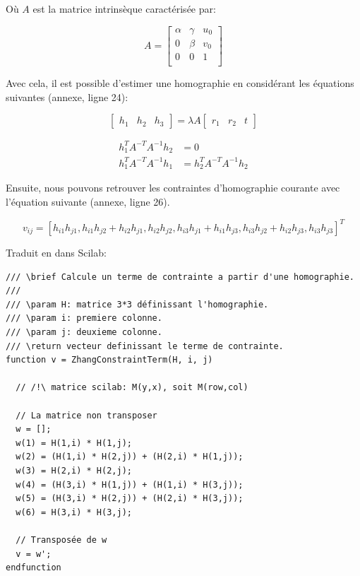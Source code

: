 \documentclass[a4paper,11pt]{article}
\begin{document}
Où $A$ est la matrice intrinsèque caractérisée par:

\begin{equation}
  A=
  \begin{bmatrix}
   \alpha & \gamma & u_0 \\
   0 & \beta & v_0 \\
   0 & 0 & 1 \\
  \end{bmatrix}
\end{equation}

Avec cela, il est possible d'estimer une homographie en considérant les équations 
suivantes (annexe, ligne 24):

\begin{equation}
  \begin{bmatrix}
    h_1 & h_2 & h_3
  \end{bmatrix}
  = \lambda A 
  \begin{bmatrix}
    r_1 & r_2 & t
  \end{bmatrix}
\end{equation}

\begin{equation}
  \begin{aligned}
    h_1^T A^{-T} A^{-1} h_2 &= 0 \\
    h_1^T A^{-T} A^{-1} h_1 &= h_2^T A^{-T} A^{-1} h_2
  \end{aligned}
\end{equation}

Ensuite, nous pouvons retrouver les contraintes d'homographie courante avec 
l'équation suivante (annexe, ligne 26).

\begin{equation}
  v_{ij} = [h_{i1} h_{j1} , h_{i1} h_{j2} + h_{i2} h_{j1} , h_{i2} h_{j2} ,
h_{i3} h_{j1} + h_{i1} h_{j3} , h_{i3} h_{j2} + h_{i2} h_{j3} , h_{i3} h_{j3} ]^T
\end{equation}

Traduit en dans Scilab:

\begin{lstlisting}[caption=Fonction ZhangConstraintTerm]
/// \brief Calcule un terme de contrainte a partir d'une homographie.
///
/// \param H: matrice 3*3 définissant l'homographie.
/// \param i: premiere colonne.
/// \param j: deuxieme colonne.
/// \return vecteur definissant le terme de contrainte.
function v = ZhangConstraintTerm(H, i, j)
  
  // /!\ matrice scilab: M(y,x), soit M(row,col)
  
  // La matrice non transposer
  w = [];
  w(1) = H(1,i) * H(1,j);
  w(2) = (H(1,i) * H(2,j)) + (H(2,i) * H(1,j));
  w(3) = H(2,i) * H(2,j);
  w(4) = (H(3,i) * H(1,j)) + (H(1,i) * H(3,j));
  w(5) = (H(3,i) * H(2,j)) + (H(2,i) * H(3,j));
  w(6) = H(3,i) * H(3,j);
  
  // Transposée de w
  v = w';
endfunction
\end{lstlisting}
\end{document}
